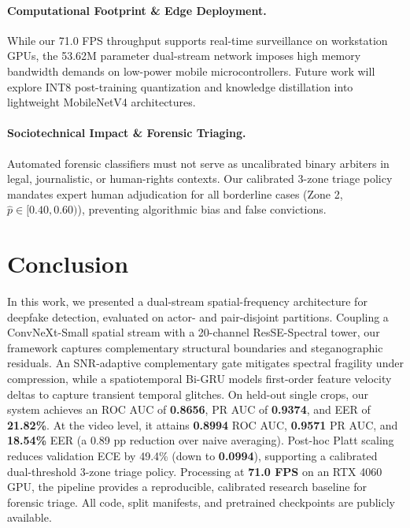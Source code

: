 \documentclass[10pt,twocolumn,letterpaper]{article}
\begin{document}
\paragraph{Computational Footprint \& Edge Deployment.}
While our 71.0 FPS throughput supports real-time surveillance on workstation GPUs, the 53.62M parameter dual-stream network imposes high memory bandwidth demands on low-power mobile microcontrollers. Future work will explore INT8 post-training quantization and knowledge distillation into lightweight MobileNetV4 architectures.

\paragraph{Sociotechnical Impact \& Forensic Triaging.}
Automated forensic classifiers must not serve as uncalibrated binary arbiters in legal, journalistic, or human-rights contexts. Our calibrated 3-zone triage policy mandates expert human adjudication for all borderline cases (Zone 2, $\hat{p} \in [0.40, 0.60)$), preventing algorithmic bias and false convictions.

\section{Conclusion}
\label{sec:conclusion}

In this work, we presented a dual-stream spatial-frequency architecture for deepfake detection, evaluated on actor- and pair-disjoint partitions. Coupling a ConvNeXt-Small spatial stream with a 20-channel ResSE-Spectral tower, our framework captures complementary structural boundaries and steganographic residuals. An SNR-adaptive complementary gate mitigates spectral fragility under compression, while a spatiotemporal Bi-GRU models first-order feature velocity deltas to capture transient temporal glitches. On held-out single crops, our system achieves an ROC AUC of \textbf{0.8656}, PR AUC of \textbf{0.9374}, and EER of \textbf{21.82\%}. At the video level, it attains \textbf{0.8994} ROC AUC, \textbf{0.9571} PR AUC, and \textbf{18.54\%} EER (a 0.89 pp reduction over naive averaging). Post-hoc Platt scaling reduces validation ECE by 49.4\% (down to \textbf{0.0994}), supporting a calibrated dual-threshold 3-zone triage policy. Processing at \textbf{71.0 FPS} on an RTX 4060 GPU, the pipeline provides a reproducible, calibrated research baseline for forensic triage. All code, split manifests, and pretrained checkpoints are publicly available.
\end{document}
